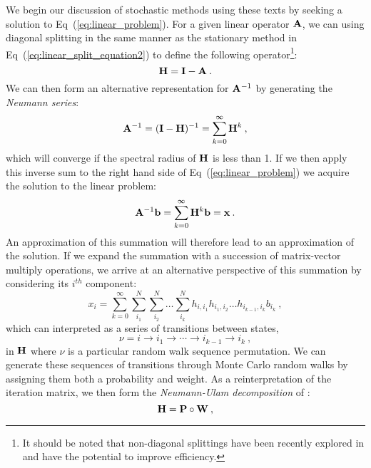 We begin our discussion of stochastic methods using these texts by
seeking a solution to Eq~(\ref{eq:linear_problem}). For a given linear
operator $\mathbf{A}$, we can using diagonal splitting in the same manner
as the stationary method in Eq~(\ref{eq:linear_split_equation2}) to
define the following operator\footnote{It should be noted that
  non-diagonal splittings have been recently explored in
  \citep{srinivasan_monte_2010} and have the potential to improve
  efficiency.}:
\begin{equation}
  \mathbf{H} = \mathbf{I} - \mathbf{A}\:.
  \label{eq:linear_mc_iteration_matrix}
\end{equation}
We can then form an alternative representation for $\mathbf{A}^{-1}$ by
generating the \textit{Neumann series}:
\begin{equation}
  \mathbf{A}^{-1} = (\mathbf{I}-\mathbf{H})^{-1} = \sum_{k=0}^{\infty} \mathbf{H}^k\:,
  \label{eq:neumann_series}
\end{equation}
which will converge if the spectral radius of $\mathbf{H}$ is less than
1. If we then apply this inverse sum to the right hand side of
Eq~(\ref{eq:linear_problem}) we acquire the solution to the linear
problem:
\begin{equation}
  \mathbf{A}^{-1}\mathbf{b} = \sum_{k=0}^{\infty} \mathbf{H}^k\mathbf{b} = \mathbf{x}\:.
  \label{eq:neumann_solution}
\end{equation}
An approximation of this summation will therefore lead to an
approximation of the solution. If we expand the summation with a
succession of matrix-vector multiply operations, we arrive at an
alternative perspective of this summation by considering its $i^{th}$
component:
\begin{equation}
  x_i = \sum_{k=0}^{\infty}\sum_{i_1}^{N}\sum_{i_2}^{N}\ldots
  \sum_{i_k}^{N}h_{i,i_1}h_{i_1,i_2}\ldots h_{i_{k-1},i_k}b_{i_k}\:,
  \label{eq:expanded_neumann_solution}
\end{equation}
which can interpreted as a series of transitions between states,
\begin{equation}
 \nu = i \rightarrow i_1 \rightarrow \cdots \rightarrow i_{k-1}
 \rightarrow i_{k}\:,
  \label{eq:mc_walk_permutation}
\end{equation}
in $\mathbf{H}$ where $\nu$ is a particular random walk sequence
permutation. We can generate these sequences of transitions through
Monte Carlo random walks by assigning them both a probability and
weight. As a reinterpretation of the iteration matrix, we then form
the \textit{Neumann-Ulam decomposition} of :
\begin{equation}
  \mathbf{H} = \mathbf{P} \circ \mathbf{W}\:,
  \label{eq:neumann_ulam_decomposition}
\end{equation}
